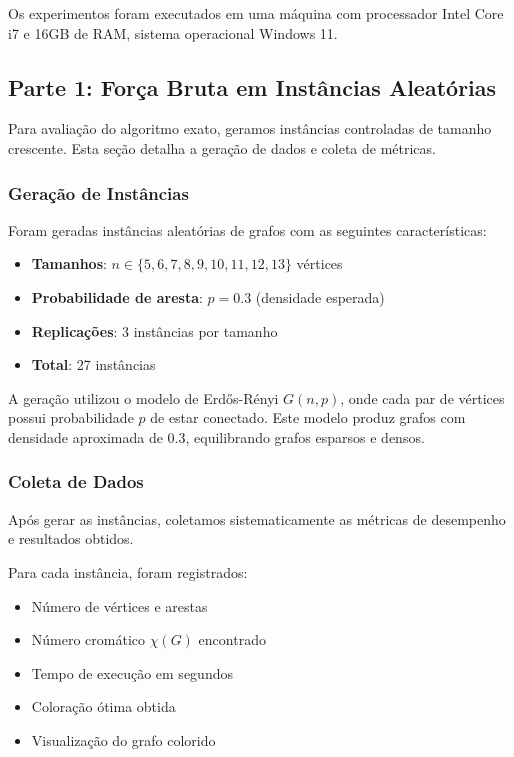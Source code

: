 \documentclass[12pt]{article}
\begin{document}
Os experimentos foram executados em uma máquina com processador Intel Core i7 e 16GB de RAM, sistema operacional Windows 11.

\subsection{Parte 1: Força Bruta em Instâncias Aleatórias}

Para avaliação do algoritmo exato, geramos instâncias controladas de tamanho crescente. Esta seção detalha a geração de dados e coleta de métricas.

\subsubsection{Geração de Instâncias}

Foram geradas instâncias aleatórias de grafos com as seguintes características:

\begin{itemize}
    \item \textbf{Tamanhos}: $n \in \{5, 6, 7, 8, 9, 10, 11, 12, 13\}$ vértices
    \item \textbf{Probabilidade de aresta}: $p = 0.3$ (densidade esperada)
    \item \textbf{Replicações}: 3 instâncias por tamanho
    \item \textbf{Total}: 27 instâncias
\end{itemize}

A geração utilizou o modelo de Erdős-Rényi $G(n, p)$, onde cada par de vértices possui probabilidade $p$ de estar conectado. Este modelo produz grafos com densidade aproximada de 0.3, equilibrando grafos esparsos e densos.

\subsubsection{Coleta de Dados}

Após gerar as instâncias, coletamos sistematicamente as métricas de desempenho e resultados obtidos.

Para cada instância, foram registrados:

\begin{itemize}
    \item Número de vértices e arestas
    \item Número cromático $\chi(G)$ encontrado
    \item Tempo de execução em segundos
    \item Coloração ótima obtida
    \item Visualização do grafo colorido
\end{itemize}
\end{document}
